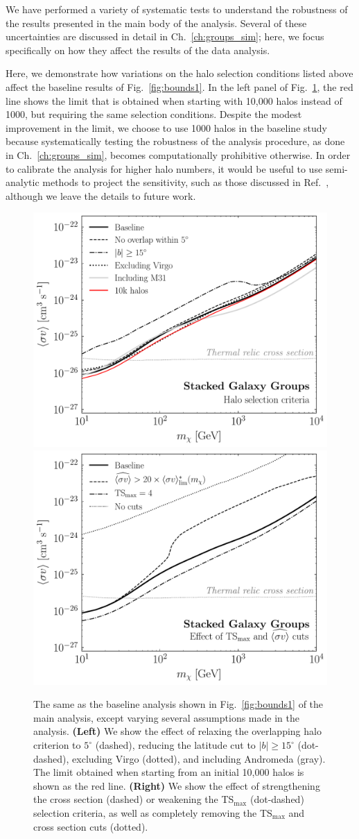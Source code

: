 We have performed a variety of systematic tests to understand the robustness of the results presented in the main body of the analysis.  Several of these uncertainties are discussed in detail in Ch.~\ref{ch:groups_sim}; here, we focus specifically on how they affect the results of the data analysis.  \vspace{0.1in}

Here, we demonstrate how variations on the halo selection conditions listed above affect the baseline results of Fig.~\ref{fig:bounds1}.  In the left panel of Fig.~\ref{fig:cutsandhalos}, the red line shows the limit that is obtained when starting with 10,000 halos instead of 1000, but requiring the same selection conditions.  Despite the modest improvement in the limit, we choose to use 1000 halos in the baseline study because systematically testing the robustness of the analysis procedure, as done in Ch.~\ref{ch:groups_sim}, becomes computationally prohibitive otherwise. In order to calibrate the analysis for higher halo numbers, it would be useful to use semi-analytic methods to project the sensitivity, such as those discussed in Ref.~\cite{Cowan:2010js,Edwards:2017mnf}, although we leave the details to future work.

\begin{figure}[b]
  \centering
	\includegraphics[width=.45\textwidth]{ch-clusters/plots/systematics_nh.pdf} 
	\includegraphics[width=.45\textwidth]{ch-clusters/plots/systematics_cuts.pdf} 
  \caption{The same as the baseline analysis shown in Fig.~\ref{fig:bounds1} of the main analysis, except varying several assumptions made in the analysis.  \textbf{(Left)} We show the effect of relaxing the overlapping halo criterion to $5^\circ$ (dashed), reducing the latitude cut to $|b|\geq 15^\circ$ (dot-dashed), excluding Virgo (dotted), and including Andromeda (gray).  The limit obtained when starting from an initial 10,000 halos is shown as the red line.  \textbf{(Right)} We show the effect of strengthening the cross section (dashed) or weakening the TS$_\text{max}$ (dot-dashed) selection criteria, as well as completely removing the TS$_\text{max}$ and cross section cuts (dotted). }
  \label{fig:cutsandhalos}
\end{figure} 

